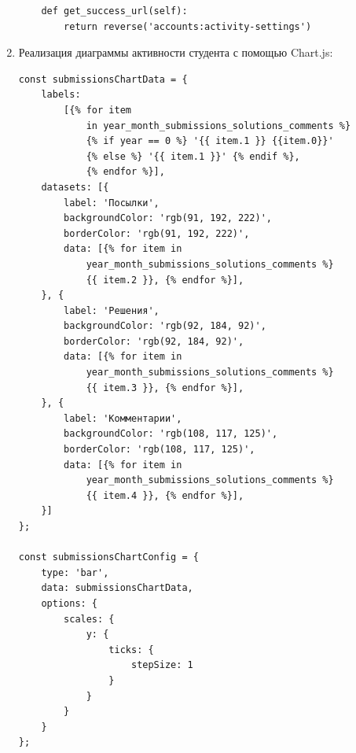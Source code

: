 \documentclass[14pt, a4paper, oneside]{extarticle}
\begin{document}
\begin{enumerate}[wide, labelindent=0pt]
{\begin{verbatim}
    def get_success_url(self):
        return reverse('accounts:activity-settings')        
        \end{verbatim}
    }
    \item {
        Реализация диаграммы активности студента с помощью Chart.js:\label{code:diagram}
        \begin{verbatim}
const submissionsChartData = {
    labels: 
        [{% for item 
            in year_month_submissions_solutions_comments %} 
            {% if year == 0 %} '{{ item.1 }} {{item.0}}' 
            {% else %} '{{ item.1 }}' {% endif %}, 
            {% endfor %}],
    datasets: [{
        label: 'Посылки',
        backgroundColor: 'rgb(91, 192, 222)',
        borderColor: 'rgb(91, 192, 222)',
        data: [{% for item in 
            year_month_submissions_solutions_comments %} 
            {{ item.2 }}, {% endfor %}],
    }, {
        label: 'Решения',
        backgroundColor: 'rgb(92, 184, 92)',
        borderColor: 'rgb(92, 184, 92)',
        data: [{% for item in 
            year_month_submissions_solutions_comments %} 
            {{ item.3 }}, {% endfor %}],
    }, {
        label: 'Комментарии',
        backgroundColor: 'rgb(108, 117, 125)',
        borderColor: 'rgb(108, 117, 125)',
        data: [{% for item in 
            year_month_submissions_solutions_comments %} 
            {{ item.4 }}, {% endfor %}],
    }]
};

const submissionsChartConfig = {
    type: 'bar',
    data: submissionsChartData,
    options: {
        scales: {
            y: {
                ticks: {
                    stepSize: 1
                }
            }
        }
    }
};


\end{verbatim}}
\end{enumerate}
\end{document}
